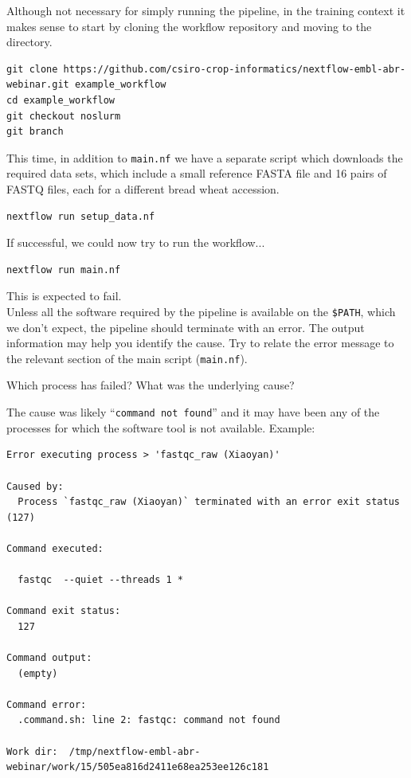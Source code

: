 \begin{steps}
Although not necessary for simply running the pipeline, in the training context it makes sense to start by cloning the workflow repository and moving to the directory.

\begin{lstlisting}
git clone https://github.com/csiro-crop-informatics/nextflow-embl-abr-webinar.git example_workflow
cd example_workflow
git checkout noslurm
git branch
\end{lstlisting}

This time, in addition to \texttt{main.nf} we have a separate script which downloads the required data sets, which include a small reference FASTA file and 16 pairs of FASTQ files, each for a different bread wheat accession. 


\begin{lstlisting}
nextflow run setup_data.nf
\end{lstlisting}


If successful, we could now try to run the workflow...

\begin{lstlisting}
nextflow run main.nf
\end{lstlisting}

\begin{warning}
This is expected to fail.\\
Unless all the software required by the pipeline is available on the \texttt{\$PATH},
which we don't expect, the pipeline should terminate with an error.
The output information may help you identify the cause. 
Try to relate the error message to the relevant section of the main script (\texttt{main.nf}). 
\end{warning}
\end{steps}

\begin{questions}
Which process has failed?
What was the underlying cause?
\begin{answer}
The cause was likely ``\texttt{command not found}'' and it may have been any of the processes for which the software tool is not available.
Example:
\begin{lstlisting}
Error executing process > 'fastqc_raw (Xiaoyan)'

Caused by:
  Process `fastqc_raw (Xiaoyan)` terminated with an error exit status (127)

Command executed:

  fastqc  --quiet --threads 1 *

Command exit status:
  127

Command output:
  (empty)

Command error:
  .command.sh: line 2: fastqc: command not found

Work dir:  /tmp/nextflow-embl-abr-webinar/work/15/505ea816d2411e68ea253ee126c181
\end{lstlisting}
\end{answer}
\end{questions}


